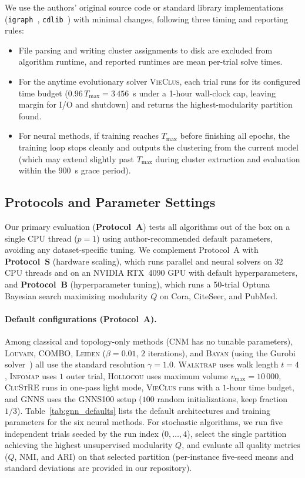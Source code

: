\documentclass[11pt,a4paper]{article}
\begin{document}
We use the authors' original source code or standard library implementations (\texttt{igraph}~\cite{igraph2006}, \texttt{cdlib}~\cite{cdlib2019}) with minimal changes, following three timing and reporting rules:
\begin{itemize}
    \item File parsing and writing cluster assignments to disk are excluded from algorithm runtime, and reported runtimes are mean per-trial solve times.
    \item For the anytime evolutionary solver \textsc{VieClus}, each trial runs for its configured time budget ($0.96\,T_{\max} = 3\,456$~s under a 1-hour wall-clock cap, leaving margin for I/O and shutdown) and returns the highest-modularity partition found.
    \item For neural methods, if training reaches $T_{\max}$ before finishing all epochs, the training loop stops cleanly and outputs the clustering from the current model (which may extend slightly past $T_{\max}$ during cluster extraction and evaluation within the $900$~s grace period).
\end{itemize}

\subsection{Protocols and Parameter Settings}

Our primary evaluation (\textbf{Protocol~A}) tests all algorithms out of the box on a single CPU thread ($p=1$) using author-recommended default parameters, avoiding any dataset-specific tuning. We complement Protocol~A with \textbf{Protocol~S} (hardware scaling), which runs parallel and neural solvers on 32 CPU threads and on an NVIDIA RTX~4090 GPU with default hyperparameters, and \textbf{Protocol~B} (hyperparameter tuning), which runs a 50-trial Optuna~\cite{optuna2019} Bayesian search maximizing modularity $Q$ on Cora, CiteSeer, and PubMed.

\paragraph*{\textbf{Default configurations (Protocol~A).}}
Among classical and topology-only methods (\textsc{CNM} has no tunable parameters), \textsc{Louvain}, \textsc{COMBO}, \textsc{Leiden} ($\beta = 0.01$, $2$ iterations), and \textsc{Bayan} (using the Gurobi solver~\cite{gurobi}) all use the standard resolution $\gamma = 1.0$. \textsc{Walktrap} uses walk length $t = 4$, \textsc{Infomap} uses $1$ outer trial, \textsc{Hollocou} uses maximum volume $v_{\max} = 10\,000$, \textsc{CluStRE} runs in one-pass light mode, \textsc{VieClus} runs with a $1$-hour time budget, and \textsc{GNNS} uses the \textsc{GNNS100} setup ($100$ random initializations, keep fraction $1/3$). Table~\ref{tab:gnn_defaults} lists the default architectures and training parameters for the six neural methods. For stochastic algorithms, we run five independent trials seeded by the run index ($0,\dots,4$), select the single partition achieving the highest unsupervised modularity $Q$, and evaluate all quality metrics ($Q$, NMI, and ARI) on that selected partition (per-instance five-seed means and standard deviations are provided in our repository).
\end{document}
